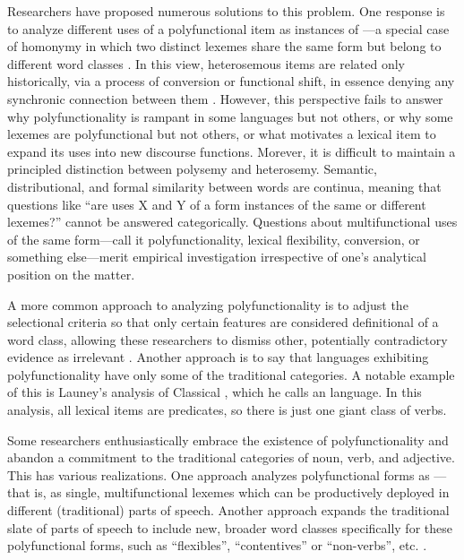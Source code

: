 Researchers have proposed numerous solutions to this problem. One response is to analyze different uses of a polyfunctional item as instances of —a special case of homonymy in which two distinct lexemes share the same form but belong to different word classes \parencite{Lichtenberk1991}. In this view, heterosemous items are related only historically, via a process of conversion or functional shift, in essence denying any synchronic connection between them \parencite{EvansOsada2005}. However, this perspective fails to answer why polyfunctionality is rampant in some languages but not others, or why some lexemes are polyfunctional but not others, or what motivates a lexical item to expand its uses into new discourse functions. Morever, it is difficult to maintain a principled distinction between polysemy and heterosemy. Semantic, distributional, and formal similarity between words are continua, meaning that questions like \enquote{are uses X and Y of a form instances of the same or different lexemes?} cannot be answered categorically. Questions about multifunctional uses of the same form—call it polyfunctionality, lexical flexibility, conversion, or something else—merit empirical investigation irrespective of one's analytical position on the matter.

A more common approach to analyzing polyfunctionality is to adjust the selectional criteria so that only certain features are considered definitional of a word class, allowing these researchers to dismiss other, potentially contradictory evidence as irrelevant . Another approach is to say that languages exhibiting polyfunctionality have only some of the traditional categories. A notable example of this is Launey's \parencites*{Launey1994}{Launey2004} analysis of Classical , which he calls an  language. In this analysis, all lexical items are predicates, so there is just one giant class of verbs.

Some researchers enthusiastically embrace the existence of polyfunctionality and abandon a commitment to the traditional categories of noun, verb, and adjective. This has various realizations. One approach analyzes polyfunctional forms as —that is, as single, multifunctional lexemes which can be productively deployed in different (traditional) parts of speech. Another approach expands the traditional slate of parts of speech to include new, broader word classes specifically for these polyfunctional forms, such as \enquote{flexibles}, \enquote{contentives} or \enquote{non-verbs}, etc. \parencites{HengeveldRijkhoff2005}{Luuk2010}.

